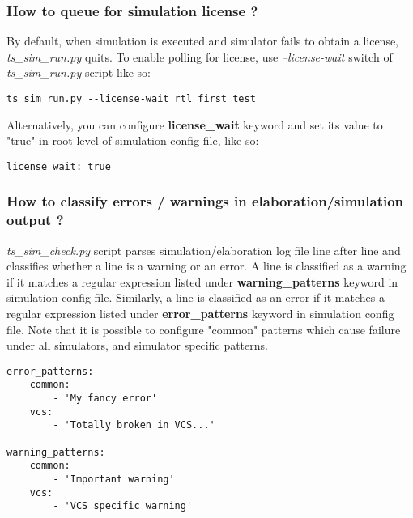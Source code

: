 \documentclass{tropic_design_spec}
\begin{document}
\subsubsection{How to queue for simulation license ?}
\label{sec:how-to-queue-for-simulation-license}

By default, when simulation is executed and simulator fails to obtain a license,
\textit{ts_sim_run.py} quits. To enable polling for license, use \textit{--license-wait}
switch of \textit{ts_sim_run.py} script like so:

\begin{lstlisting}
ts_sim_run.py --license-wait rtl first_test
\end{lstlisting}

Alternatively, you can configure \textbf{license_wait} keyword and set its value to
"true" in root level of simulation config file, like so:

\begin{lstlisting}
license_wait: true
\end{lstlisting}


\subsubsection{How to classify errors / warnings in elaboration/simulation output ?}
\label{sec:how-to-classify-errors-warnings-in-elaboration-simulation-output}

\textit{ts_sim_check.py} script parses simulation/elaboration log file line after line and classifies
whether a line is a warning or an error. A line is classified as a warning if it matches a
regular expression listed under \textbf{warning_patterns} keyword in simulation config
file. Similarly, a line is classified as an error if it matches a regular expression
listed under \textbf{error_patterns} keyword in simulation config file. Note that it is 
possible to configure "common" patterns which cause failure under all simulators, and 
simulator specific patterns.

\begin{lstlisting}
error_patterns:
    common:
        - 'My fancy error'
    vcs:
        - 'Totally broken in VCS...'

warning_patterns:
    common:
        - 'Important warning'
    vcs:
        - 'VCS specific warning'
\end{lstlisting}
 
\end{document}
